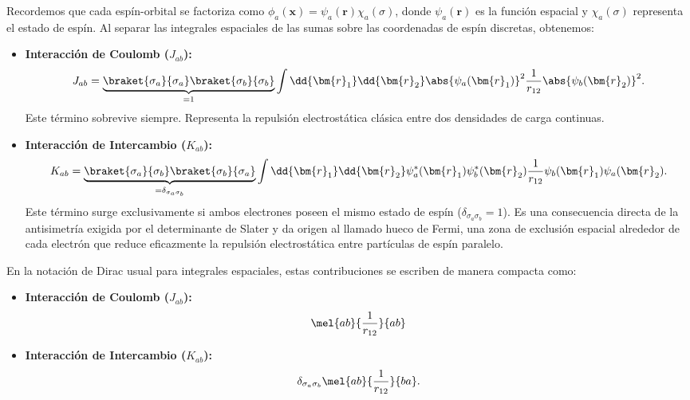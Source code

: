 Recordemos que cada espín-orbital se factoriza como \( \phi_a(\bm{x}) = \psi_a(\bm{r}) \chi_a(\sigma) \), donde \( \psi_a(\bm{r}) \) es la función espacial y \( \chi_a(\sigma) \) representa el estado de espín. Al separar las integrales espaciales de las sumas sobre las coordenadas de espín discretas, obtenemos:

\begin{itemize}
\item \textbf{Interacción de Coulomb (\(J_{ab}\)):}
  \begin{equation}
  J_{ab} = \underbrace{ \braket{\sigma_a}{\sigma_a} \braket{\sigma_b}{\sigma_b} }_{= 1} \int \dd{\bm{r}_1} \dd{\bm{r}_2} \abs{\psi_a(\bm{r}_1)}^2 \frac{1}{r_{12}} \abs{\psi_b(\bm{r}_2)}^2.
  \end{equation}
  Este término sobrevive siempre. Representa la repulsión electrostática clásica entre dos densidades de carga continuas.

\item \textbf{Interacción de Intercambio (\(K_{ab}\)):}
  \begin{equation}
  K_{ab} = \underbrace{ \braket{\sigma_a}{\sigma_b} \braket{\sigma_b}{\sigma_a} }_{= \delta_{\sigma_a \sigma_b}} \int \dd{\bm{r}_1} \dd{\bm{r}_2} \psi_a^*(\bm{r}_1)\psi_b^*(\bm{r}_2)\frac{1}{r_{12}}\psi_b(\bm{r}_1)\psi_a(\bm{r}_2).
  \end{equation}
  Este término surge exclusivamente si ambos electrones poseen el mismo estado de espín (\( \delta_{\sigma_a \sigma_b} = 1 \)). Es una consecuencia directa de la antisimetría exigida por el determinante de Slater y da origen al llamado hueco de Fermi, una zona de exclusión espacial alrededor de cada electrón que reduce eficazmente la repulsión electrostática entre partículas de espín paralelo.
\end{itemize}

En la notación de Dirac usual para integrales espaciales, estas contribuciones se escriben de manera compacta como:

\begin{itemize}
\item \textbf{Interacción de Coulomb (\(J_{ab}\)):}
  \begin{equation}
  \mel{ab}{\frac{1}{r_{12}}}{ab}
  \end{equation}
\item \textbf{Interacción de Intercambio (\(K_{ab}\)):}
  \begin{equation}
  \delta_{\sigma_a \sigma_b} \mel{ab}{\frac{1}{r_{12}}}{ba}.
  \end{equation}
\end{itemize}

